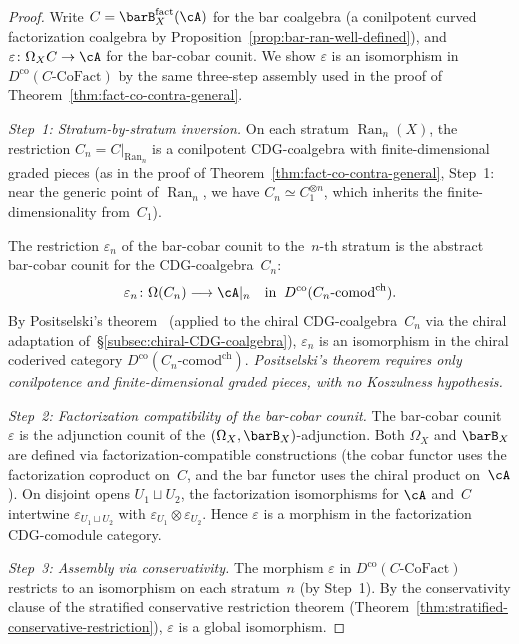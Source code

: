 \begin{proof}
Write $C = \barB_X^{\mathrm{fact}}(\cA)$ for the bar coalgebra
(a conilpotent curved factorization coalgebra by
Proposition~\ref{prop:bar-ran-well-defined}),
and $\varepsilon \colon \Omega_X C \to \cA$ for the bar-cobar
counit.  We show $\varepsilon$ is an isomorphism in
$D^{\mathrm{co}}(C\text{-}\mathrm{CoFact})$ by the same
three-step assembly used in the proof of
Theorem~\ref{thm:fact-co-contra-general}.

\emph{Step~1: Stratum-by-stratum inversion.}
On each stratum $\operatorname{Ran}_n(X)$, the restriction
$C_n = C|_{\operatorname{Ran}_n}$ is a conilpotent CDG-coalgebra
with finite-dimensional graded pieces (as in the proof of
Theorem~\ref{thm:fact-co-contra-general}, Step~1: near the
generic point of $\operatorname{Ran}_n$, we have
$C_n \simeq C_1^{\otimes n}$, which inherits the
finite-dimensionality from~$C_1$).

The restriction $\varepsilon_n$ of the bar-cobar counit to
the~$n$-th stratum is the abstract bar-cobar counit for the
CDG-coalgebra~$C_n$:
\[
\varepsilon_n \colon \Omega(C_n) \longrightarrow \cA|_n
\quad \text{in} \;\;
D^{\mathrm{co}}(C_n\text{-}\mathrm{comod}^{\mathrm{ch}}).
\]
By Positselski's theorem~\cite[Theorem~7.2]{Positselski11}
(applied to the chiral CDG-coalgebra~$C_n$ via
the chiral adaptation of~\S\ref{subsec:chiral-CDG-coalgebra}),
$\varepsilon_n$ is an isomorphism in the chiral coderived
category $D^{\mathrm{co}}(C_n\text{-}\mathrm{comod}^{\mathrm{ch}})$.
\emph{Positselski's theorem requires only
conilpotence and finite-dimensional graded pieces, with
no Koszulness hypothesis.}

\emph{Step~2: Factorization compatibility of the bar-cobar
counit.}
The bar-cobar counit $\varepsilon$ is the adjunction counit of
the $(\Omega_X, \barB_X)$-adjunction.  Both $\Omega_X$ and
$\barB_X$ are defined via factorization-compatible constructions
(the cobar functor uses the factorization coproduct on~$C$, and
the bar functor uses the chiral product on~$\cA$).  On disjoint
opens $U_1 \sqcup U_2$, the factorization isomorphisms for
$\cA$ and~$C$ intertwine $\varepsilon_{U_1 \sqcup U_2}$
with $\varepsilon_{U_1} \otimes \varepsilon_{U_2}$.
Hence $\varepsilon$ is a morphism in the factorization
CDG-comodule category.

\emph{Step~3: Assembly via conservativity.}
The morphism $\varepsilon$ in
$D^{\mathrm{co}}(C\text{-}\mathrm{CoFact})$ restricts to an
isomorphism on each stratum~$n$ (by Step~1).  By the
conservativity clause of the stratified conservative restriction
theorem (Theorem~\ref{thm:stratified-conservative-restriction}),
$\varepsilon$ is a global isomorphism.
\end{proof}

